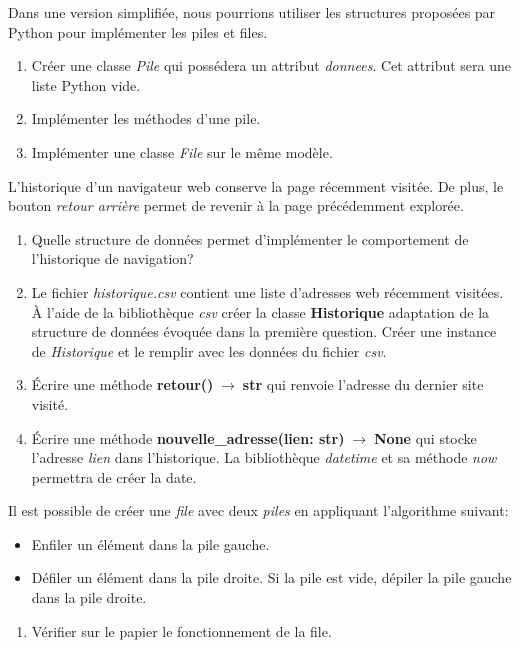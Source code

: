 \documentclass[a4paper,11pt]{article}
\begin{document}
\begin{Form}
\begin{exo}
Dans une version simplifiée, nous pourrions utiliser les structures proposées par Python pour implémenter les piles et files.
\begin{enumerate}
\item Créer une classe \emph{Pile} qui possédera un attribut \emph{donnees}. Cet attribut sera une liste Python vide.
\item Implémenter les méthodes d'une pile.
\item Implémenter une classe \emph{File} sur le même modèle.
\end{enumerate}
\end{exo}
\begin{exo}
L'historique d'un navigateur web conserve la page récemment visitée. De plus, le bouton \emph{retour arrière} permet de revenir à la page précédemment explorée.
\begin{enumerate}
\item Quelle structure de données permet d'implémenter le comportement de l'historique de navigation?
\item Le fichier \emph{historique.csv} contient une liste d'adresses web récemment visitées. À l'aide de la bibliothèque \emph{csv} créer la classe \textbf{Historique} adaptation de la structure de données évoquée dans la première question. Créer une instance de \emph{Historique} et le remplir avec les données du fichier \emph{csv}.
\item Écrire une méthode \textbf{retour()$\;\rightarrow\;$str} qui renvoie l'adresse du dernier site visité.
\item Écrire une méthode \textbf{nouvelle\_adresse(lien: str)$\;\rightarrow\;$None} qui stocke l'adresse \emph{lien} dans l'historique. La bibliothèque \emph{datetime} et sa méthode \emph{now} permettra de créer la date.
\end{enumerate}
\end{exo}
\begin{exo}
Il est possible de créer une \emph{file} avec deux \emph{piles} en appliquant l'algorithme suivant:
\begin{itemize}
\item Enfiler un élément dans la pile gauche.
\item Défiler un élément dans la pile droite. Si la pile est vide, dépiler la pile gauche dans la pile droite.
\end{itemize}
\begin{enumerate}
\item Vérifier sur le papier le fonctionnement de la file.

\end{enumerate}
\end{exo}
\end{Form}
\end{document}
